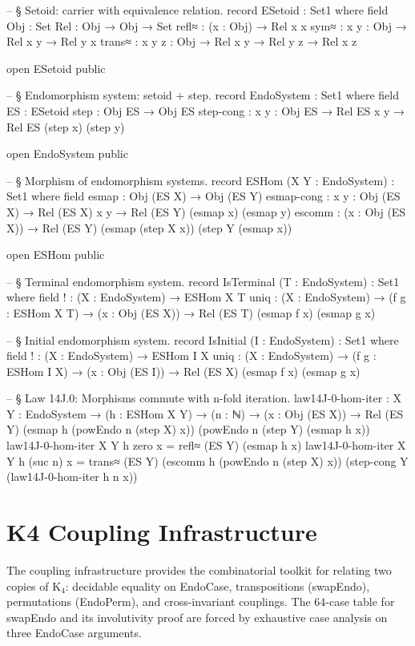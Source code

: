 \documentclass[11pt,a4paper]{book}
\def\texttt#1{#1}%
\def\texorpdfstring#1#2{#2}%
\begin{document}
\begin{code}
-- § Setoid: carrier with equivalence relation.
record ESetoid : Set1 where
  field
    Obj    : Set
    Rel    : Obj → Obj → Set
    refl≈  : (x : Obj) → Rel x x
    sym≈   : {x y : Obj} → Rel x y → Rel y x
    trans≈ : {x y z : Obj} → Rel x y → Rel y z → Rel x z

open ESetoid public

-- § Endomorphism system: setoid + step.
record EndoSystem : Set1 where
  field
    ES    : ESetoid
    step : Obj ES → Obj ES
    step-cong : {x y : Obj ES} → Rel ES x y → Rel ES (step x) (step y)

open EndoSystem public

-- § Morphism of endomorphism systems.
record ESHom (X Y : EndoSystem) : Set1 where
  field
    esmap  : Obj (ES X) → Obj (ES Y)
    esmap-cong : {x y : Obj (ES X)} → Rel (ES X) x y → Rel (ES Y) (esmap x) (esmap y)
    escomm : (x : Obj (ES X)) → Rel (ES Y) (esmap (step X x)) (step Y (esmap x))

open ESHom public

-- § Terminal endomorphism system.
record IsTerminal (T : EndoSystem) : Set1 where
  field
    !    : (X : EndoSystem) → ESHom X T
    uniq : (X : EndoSystem) → (f g : ESHom X T) → (x : Obj (ES X)) → Rel (ES T) (esmap f x) (esmap g x)

-- § Initial endomorphism system.
record IsInitial (I : EndoSystem) : Set1 where
  field
    !    : (X : EndoSystem) → ESHom I X
    uniq : (X : EndoSystem) → (f g : ESHom I X) → (x : Obj (ES I)) → Rel (ES X) (esmap f x) (esmap g x)

-- § Law 14J.0: Morphisms commute with n-fold iteration.
law14J-0-hom-iter :
  {X Y : EndoSystem} →
  (h : ESHom X Y) →
  (n : ℕ) →
  (x : Obj (ES X)) →
  Rel (ES Y) (esmap h (powEndo n (step X) x)) (powEndo n (step Y) (esmap h x))
law14J-0-hom-iter {X} {Y} h zero x = refl≈ (ES Y) (esmap h x)
law14J-0-hom-iter {X} {Y} h (suc n) x =
  trans≈ (ES Y)
    (escomm h (powEndo n (step X) x))
    (step-cong Y (law14J-0-hom-iter h n x))
\end{code}

\section{K\texorpdfstring{$_4$}{4} Coupling Infrastructure}

The coupling infrastructure provides the combinatorial toolkit for relating two copies of
K$_4$: decidable equality on \texttt{EndoCase}, transpositions (\texttt{swapEndo}), permutations
(\texttt{EndoPerm}), and cross-invariant couplings. The $64$-case table for \texttt{swapEndo}
and its involutivity proof are forced by exhaustive case analysis on three \texttt{EndoCase}
arguments.
\end{document}

